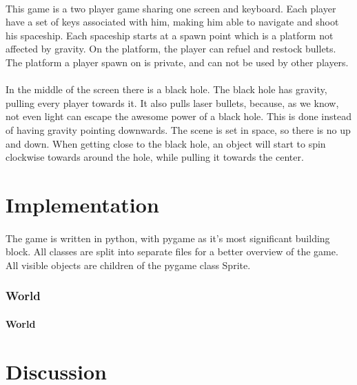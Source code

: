 \documentclass{article}
\begin{document}
\paragraph{}
This game is a two player game sharing one screen and keyboard. Each player have a set of keys associated with him, making him able to navigate and shoot his spaceship. Each spaceship starts at a spawn point which is a platform not affected by gravity. On the platform, the player can refuel and restock bullets. The platform a player spawn on is private, and can not be used by other players. 
\paragraph{}
In the middle of the screen there is a black hole. The black hole has gravity, pulling every player towards it. It also pulls laser bullets, because, as we know, not even light can escape the awesome power of a black hole. This is done instead of having gravity pointing downwards. The scene is set in space, so there is no up and down. When getting close to the black hole, an object will start to spin clockwise towards around the hole, while pulling it towards the center. 
\paragraph{}

\section{Implementation}
\paragraph{}
The game is written in python, with pygame as it's most significant building block. All classes are split into separate files for a better overview of the game. All visible objects are children of the pygame class Sprite.
\subsubsection{World}
\paragraph{World}


\section{Discussion}
\end{document}

